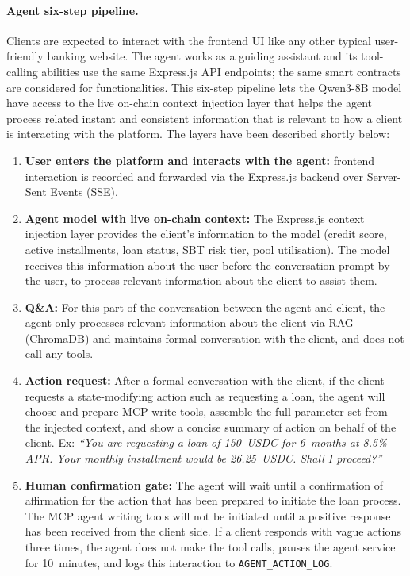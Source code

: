 \documentclass[12pt,a4paper]{report}
\begin{document}
\paragraph{Agent six-step pipeline.} Clients are expected to interact with the frontend UI like any other typical user-friendly banking website. The agent works as a guiding assistant and its tool-calling abilities use the same Express.js API endpoints; the same smart contracts are considered for functionalities. This six-step pipeline lets the Qwen3-8B model have access to the live on-chain context injection layer that helps the agent process related instant and consistent information that is relevant to how a client is interacting with the platform. The layers have been described shortly below:

\begin{enumerate}[noitemsep]
\item \textbf{User enters the platform and interacts with the agent:} frontend interaction is recorded and forwarded via the Express.js backend over Server-Sent Events (SSE).
\item \textbf{Agent model with live on-chain context:} The Express.js context injection layer provides the client's information to the model (credit score, active installments, loan status, SBT risk tier, pool utilisation). The model receives this information about the user before the conversation prompt by the user, to process relevant information about the client to assist them.
\item \textbf{Q\&A:} For this part of the conversation between the agent and client, the agent only processes relevant information about the client via RAG (ChromaDB) and maintains formal conversation with the client, and does not call any tools.
\item \textbf{Action request:} After a formal conversation with the client, if the client requests a state-modifying action such as requesting a loan, the agent will choose and prepare MCP write tools, assemble the full parameter set from the injected context, and show a concise summary of action on behalf of the client. Ex: \emph{``You are requesting a loan of 150~USDC for 6~months at 8.5\% APR. Your monthly installment would be 26.25~USDC. Shall I proceed?''}
\item \textbf{Human confirmation gate:} The agent will wait until a confirmation of affirmation for the action that has been prepared to initiate the loan process. The MCP agent writing tools will not be initiated until a positive response has been received from the client side. If a client responds with vague actions three times, the agent does not make the tool calls, pauses the agent service for 10~minutes, and logs this interaction to \texttt{AGENT\_ACTION\_LOG}.

\end{enumerate}
\end{document}
